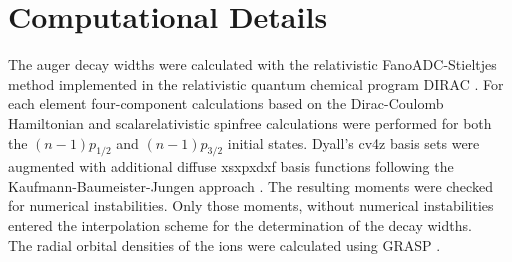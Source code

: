 \section{Computational Details}
\label{section:computational}
The auger decay widths were calculated with the relativistic FanoADC-Stieltjes
method
implemented in the relativistic quantum chemical program DIRAC \cite{DIRAC17}.
For each element four-component calculations based on the Dirac-Coulomb Hamiltonian
and scalarelativistic spinfree calculations were
performed for both the $(n-1)p_{1/2}$ and $(n-1)p_{3/2}$ initial states.
Dyall's cv4z basis sets \cite{Dyall4s-7s09} were augmented with additional diffuse
xsxpxdxf
basis functions following the Kaufmann-Baumeister-Jungen approach
\cite{Kaufmann89}.
The resulting moments were checked for numerical instabilities.
Only those moments, without numerical instabilities entered the interpolation
scheme for the determination of the decay widths.\\
The radial orbital densities of the ions were calculated using GRASP
\cite{Parpia96,xyz}.
